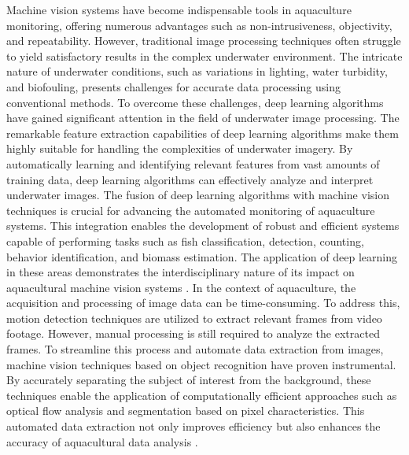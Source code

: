Machine vision systems have become indispensable tools in aquaculture monitoring, offering numerous advantages such as non-intrusiveness, objectivity, and repeatability. However, traditional image processing techniques often struggle to yield satisfactory results in the complex underwater environment. The intricate nature of underwater conditions, such as variations in lighting, water turbidity, and biofouling, presents challenges for accurate data processing using conventional methods. To overcome these challenges, deep learning algorithms have gained significant attention in the field of underwater image processing. The remarkable feature extraction capabilities of deep learning algorithms make them highly suitable for handling the complexities of underwater imagery. By automatically learning and identifying relevant features from vast amounts of training data, deep learning algorithms can effectively analyze and interpret underwater images. The fusion of deep learning algorithms with machine vision techniques is crucial for advancing the automated monitoring of aquaculture systems. This integration enables the development of robust and efficient systems capable of performing tasks such as fish classification, detection, counting, behavior identification, and biomass estimation. The application of deep learning in these areas demonstrates the interdisciplinary nature of its impact on aquacultural machine vision systems \cite{li2022recent}. In the context of aquaculture, the acquisition and processing of image data can be time-consuming. To address this, motion detection techniques are utilized to extract relevant frames from video footage. However, manual processing is still required to analyze the extracted frames. To streamline this process and automate data extraction from images, machine vision techniques based on object recognition have proven instrumental. By accurately separating the subject of interest from the background, these techniques enable the application of computationally efficient approaches such as optical flow analysis and segmentation based on pixel characteristics. This automated data extraction not only improves efficiency but also enhances the accuracy of aquacultural data analysis \cite{monkman2019using}.\\

